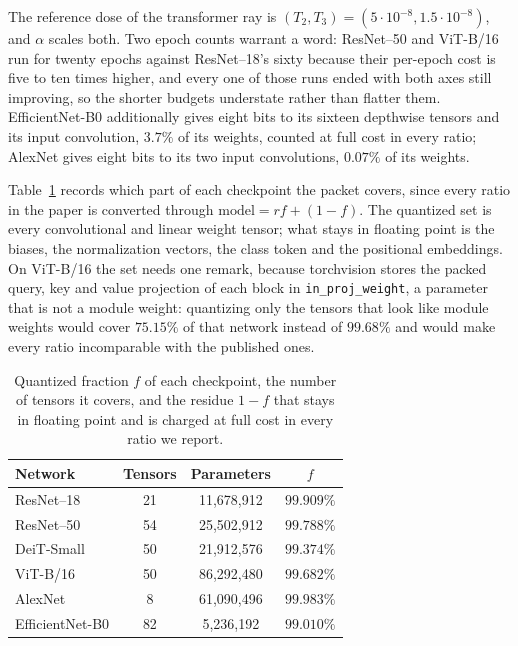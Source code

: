 \documentclass{article}
\begin{document}
The reference dose of the transformer ray is $(T_2,T_3)=(5\cdot10^{-8},
1.5\cdot10^{-8})$, and $\alpha$ scales both. Two epoch counts warrant a word:
ResNet--50 and ViT-B/16 run for twenty epochs against ResNet--18's sixty because
their per-epoch cost is five to ten times higher, and every one of those runs
ended with both axes still improving, so the shorter budgets understate rather
than flatter them. EfficientNet-B0 additionally gives eight bits to its sixteen
depthwise tensors and its input convolution, $3.7\%$ of its weights, counted at
full cost in every ratio; AlexNet gives eight bits to its two input convolutions,
$0.07\%$ of its weights.

Table~\ref{tab:quantized-fraction} records which part of each checkpoint the
packet covers, since every ratio in the paper is converted through
$\text{model}=rf+(1-f)$. The quantized set is every convolutional and linear
weight tensor; what stays in floating point is the biases, the normalization
vectors, the class token and the positional embeddings. On ViT-B/16 the set needs
one remark, because torchvision stores the packed query, key and value projection
of each block in \texttt{in\_proj\_weight}, a parameter that is not a module
weight: quantizing only the tensors that look like module weights would cover
$75.15\%$ of that network instead of $99.68\%$ and would make every ratio
incomparable with the published ones.

\begin{table}[ht]
  \caption{Quantized fraction $f$ of each checkpoint, the number of tensors it
  covers, and the residue $1-f$ that stays in floating point and is charged at
  full cost in every ratio we report.}
  \label{tab:quantized-fraction}
  \centering \small
  \begin{tabular}{lccc}
    \toprule
    Network & Tensors & Parameters & $f$ \\
    \midrule
    ResNet--18 & 21 & 11{,}678{,}912 & $99.909\%$ \\
    ResNet--50 & 54 & 25{,}502{,}912 & $99.788\%$ \\
    DeiT-Small & 50 & 21{,}912{,}576 & $99.374\%$ \\
    ViT-B/16 & 50 & 86{,}292{,}480 & $99.682\%$ \\
    AlexNet & 8 & 61{,}090{,}496 & $99.983\%$ \\
    EfficientNet-B0 & 82 & 5{,}236{,}192 & $99.010\%$ \\
    \bottomrule
  \end{tabular}
\end{table}
\end{document}
